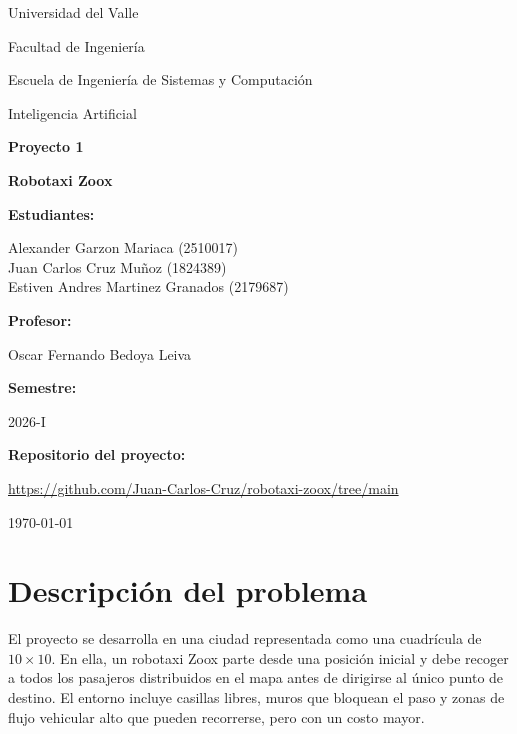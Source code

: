 \documentclass[12pt,a4paper]{article}
\newcommand{\universidad}{Universidad del Valle}
\newcommand{\facultad}{Facultad de Ingeniería}
\newcommand{\escuela}{Escuela de Ingeniería de Sistemas y Computación}
\newcommand{\materia}{Inteligencia Artificial}
\newcommand{\profesor}{Oscar Fernando Bedoya Leiva}
\newcommand{\estudiantes}{
    Alexander Garzon Mariaca (2510017)\\
    Juan Carlos Cruz Muñoz (1824389)\\
    Estiven Andres Martinez Granados (2179687)
}
\begin{document}

\begin{titlepage}
    \centering
    {\Large \universidad \par}
    \vspace{0.2cm}
    {\large \facultad \par}
    \vspace{0.2cm}
    {\large \escuela \par}
    \vspace{1.2cm}
    {\Large \materia \par}
    \vspace{1.8cm}
    {\Huge \textbf{Proyecto 1} \par}
    \vspace{0.5cm}
    {\LARGE \textbf{Robotaxi Zoox} \par}
    \vspace{2cm}

    \begin{center}
        \textbf{Estudiantes:}\par
        \estudiantes

        \vspace{0.8cm}
        \textbf{Profesor:}\par
        \profesor\par

        \vspace{0.8cm}
        \textbf{Semestre:}\par
        2026-I

        \vspace{0.8cm}
        \textbf{Repositorio del proyecto:}\par
        \small \url{https://github.com/Juan-Carlos-Cruz/robotaxi-zoox/tree/main}\normalsize
    \end{center}

    \vfill
    {\large \today \par}
\end{titlepage}

\clearpage
{}
\tableofcontents
\newpage

\section{Descripción del problema}
El proyecto se desarrolla en una ciudad representada como una cuadrícula de \(10 \times 10\). En ella, un robotaxi Zoox parte desde una posición inicial y debe recoger a todos los pasajeros distribuidos en el mapa antes de dirigirse al único punto de destino. El entorno incluye casillas libres, muros que bloquean el paso y zonas de flujo vehicular alto que pueden recorrerse, pero con un costo mayor.
\end{document}
